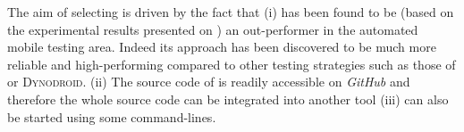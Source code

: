 The aim of selecting \sapienz is driven by the fact that (i) \sapienz has been found to be (based on the experimental results presented on \cite{sapienz}) an out-performer in the automated mobile testing area. Indeed its approach has been discovered to be much more reliable and high-performing compared to other testing strategies such as those of \monkey or \textsc{Dynodroid}. (ii) The source code of \sapienz is readily accessible on \textit{GitHub} and therefore the whole source code can be integrated into another tool (iii) \sapienz can also be started using some command-lines. 











